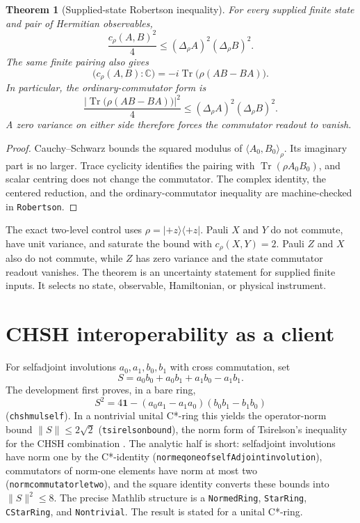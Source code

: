 \documentclass[11pt]{article}
\renewcommand{\_}{\textunderscore\allowbreak}
\newtheorem{theorem}{Theorem}
\theoremstyle{remark}
\newcommand{\Tr}{\operatorname{Tr}}
\newcommand{\one}{\mathbf 1}
\newcommand{\norm}[1]{\lVert #1\rVert}
\begin{document}
\begin{theorem}[Supplied-state Robertson inequality]
\label{thm:finite-robertson}
For every supplied finite state and pair of Hermitian observables,
\[
 \frac{c_\rho(A,B)^2}{4}
 \le (\Delta_\rho A)^2(\Delta_\rho B)^2.
\]
The same finite pairing also gives
\[
 \bigl(c_\rho(A,B):\mathbb C\bigr)=
 -i\Tr\bigl(\rho(AB-BA)\bigr).
\]
In particular, the ordinary-commutator form is
\[
 \frac{\left|\Tr\bigl(\rho(AB-BA)\bigr)\right|^2}{4}
 \le (\Delta_\rho A)^2(\Delta_\rho B)^2.
\]
A zero variance on either side therefore forces the commutator readout to
vanish.
\end{theorem}

\begin{proof}
Cauchy--Schwarz bounds the squared modulus of
$\langle A_0,B_0\rangle_\rho$. Its imaginary part is no larger. Trace
cyclicity identifies the pairing with $\Tr(\rho A_0B_0)$, and scalar centring
does not change the commutator. The complex identity, the centered reduction,
and the ordinary-commutator inequality are machine-checked in
\texttt{Robertson}.
\end{proof}

The exact two-level control uses $\rho=|{+z}\rangle\langle{+z}|$.
Pauli $X$ and $Y$ do not commute, have unit variance, and saturate the bound
with $c_\rho(X,Y)=2$. Pauli $Z$ and $X$ also do not commute, while $Z$ has
zero variance and the state commutator readout vanishes. The theorem is an
uncertainty statement for supplied finite inputs. It selects no state,
observable, Hamiltonian, or physical instrument.

\section{CHSH interoperability as a client}
\label{sec:chsh}

For selfadjoint involutions $a_0,a_1,b_0,b_1$ with cross commutation, set
\[
 S=a_0b_0+a_0b_1+a_1b_0-a_1b_1.
\]
The development first proves, in a bare ring,
\[
 S^2=4\one-(a_0a_1-a_1a_0)(b_0b_1-b_1b_0)
\]
(\texttt{chsh\_mul\_self}). In a nontrivial unital C*-ring this yields the
operator-norm bound $\norm{S}\le2\sqrt2$
(\texttt{tsirelson\_bound}), the norm form of Tsirelson's inequality
\cite{tsirelson1980} for the CHSH combination \cite{chsh1969}. The analytic
half is short: selfadjoint involutions have norm one by the C*-identity
(\texttt{norm\_eq\_one\_of\_selfAdjoint\_involution}), commutators of
norm-one elements have norm at most two
(\texttt{norm\_commutator\_le\_two}), and the square identity converts these
bounds into $\norm{S}^2\le8$. The precise Mathlib structure is a
\texttt{NormedRing}, \texttt{StarRing}, \texttt{CStarRing}, and
\texttt{Nontrivial}. The result is stated for a unital C*-ring.
\end{document}
